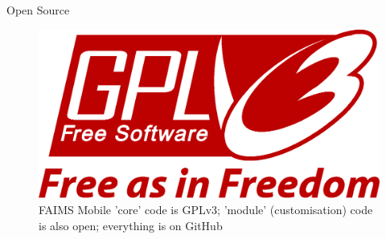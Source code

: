 \documentclass[aspectratio=169, 11pt]{beamer} %
\begin{document}
\begin{frame}{Open Source}
 \begin{figure}[H]
    \centering
        \includegraphics[width=.75\textwidth]{figures/GPLv3_Logo.eps}
        \caption{FAIMS Mobile 'core' code is GPLv3; 'module' (customisation) code is also open; everything is on GitHub}
        \label{fig:FAIMS-github-OSS}
 \end{figure}
\end{frame}
\end{document}
